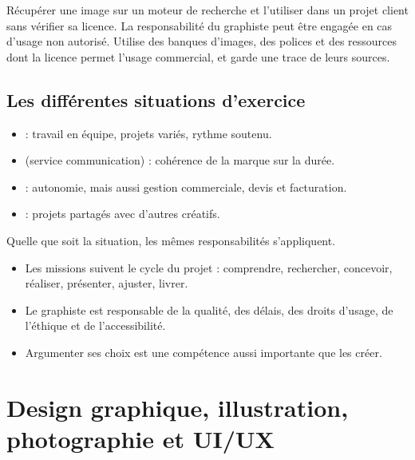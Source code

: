 \begin{erreur}
Récupérer une image sur un moteur de recherche et l'utiliser dans un projet client sans vérifier sa licence. La responsabilité du graphiste peut être engagée en cas d'usage non autorisé. Utilise des banques d'images, des polices et des ressources dont la licence permet l'usage commercial, et garde une trace de leurs sources.
\end{erreur}

\subsection{Les différentes situations d'exercice}

\begin{itemize}
    \item {} : travail en équipe, projets variés, rythme soutenu.
    \item {} (service communication) : cohérence de la marque sur la durée.
    \item {} : autonomie, mais aussi gestion commerciale, devis et facturation.
    \item {} : projets partagés avec d'autres créatifs.
\end{itemize}

Quelle que soit la situation, les mêmes responsabilités s'appliquent.

\begin{retenir}
\begin{itemize}
    \item Les missions suivent le cycle du projet : comprendre, rechercher, concevoir, réaliser, présenter, ajuster, livrer.
    \item Le graphiste est responsable de la qualité, des délais, des droits d'usage, de l'éthique et de l'accessibilité.
    \item Argumenter ses choix est une compétence aussi importante que les créer.
\end{itemize}
\end{retenir}

\section{Design graphique, illustration, photographie et UI/UX}

